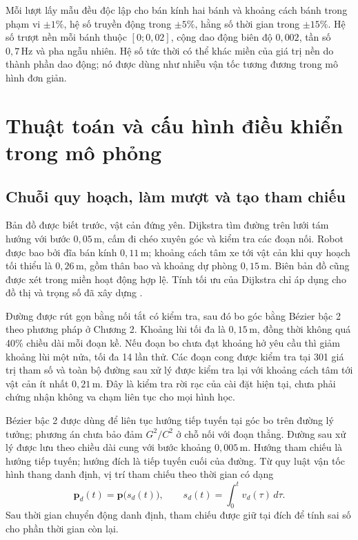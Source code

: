 \documentclass[12pt,a4paper,oneside]{report}
\begin{document}
Mỗi lượt lấy mẫu đều độc lập cho bán kính hai bánh và khoảng cách bánh trong phạm vi \(\pm1\%\), hệ số truyền động trong \(\pm5\%\), hằng số thời gian trong \(\pm15\%\). Hệ số trượt nền mỗi bánh thuộc \([0;0{,}02]\), cộng dao động biên độ \(0{,}002\), tần số \(0{,}7\,\mathrm{Hz}\) và pha ngẫu nhiên. Hệ số tức thời có thể khác miền của giá trị nền do thành phần dao động; nó được dùng như nhiễu vận tốc tương đương trong mô hình đơn giản.

\clearpage
\section{Thuật toán và cấu hình điều khiển trong mô phỏng}

\subsection{Chuỗi quy hoạch, làm mượt và tạo tham chiếu}

Bản đồ được biết trước, vật cản đứng yên. Dijkstra tìm đường trên lưới tám hướng với bước \(0{,}05\,\mathrm{m}\), cấm đi chéo xuyên góc và kiểm tra các đoạn nối. Robot được bao bởi đĩa bán kính \(0{,}11\,\mathrm{m}\); khoảng cách tâm xe tới vật cản khi quy hoạch tối thiểu là \(0{,}26\,\mathrm{m}\), gồm thân bao và khoảng dự phòng \(0{,}15\,\mathrm{m}\). Biên bản đồ cũng được xét trong miền hoạt động hợp lệ. Tính tối ưu của Dijkstra chỉ áp dụng cho đồ thị và trọng số đã xây dựng \cite{lavalle-planning-2006}.

Đường được rút gọn bằng nối tắt có kiểm tra, sau đó bo góc bằng Bézier bậc 2 theo phương pháp ở Chương 2. Khoảng lùi tối đa là \(0{,}15\,\mathrm{m}\), đồng thời không quá 40\% chiều dài mỗi đoạn kề. Nếu đoạn bo chưa đạt khoảng hở yêu cầu thì giảm khoảng lùi một nửa, tối đa 14 lần thử. Các đoạn cong được kiểm tra tại 301 giá trị tham số và toàn bộ đường sau xử lý được kiểm tra lại với khoảng cách tâm tới vật cản ít nhất \(0{,}21\,\mathrm{m}\). Đây là kiểm tra rời rạc của cài đặt hiện tại, chưa phải chứng nhận không va chạm liên tục cho mọi hình học.

Bézier bậc 2 được dùng để liên tục hướng tiếp tuyến tại góc bo trên đường lý tưởng; phương án chưa bảo đảm \(G^2/C^2\) ở chỗ nối với đoạn thẳng. Đường sau xử lý được lưu theo chiều dài cung với bước khoảng \(0{,}005\,\mathrm{m}\). Hướng tham chiếu là hướng tiếp tuyến; hướng đích là tiếp tuyến cuối của đường. Từ quy luật vận tốc hình thang danh định, vị trí tham chiếu theo thời gian có dạng
\begin{equation}
  \mathbf p_d(t)=\mathbf p\bigl(s_d(t)\bigr),\qquad
  s_d(t)=\int_0^t v_d(\tau)\,d\tau.
  \label{eq:c4-time-reference}
\end{equation}
Sau thời gian chuyển động danh định, tham chiếu được giữ tại đích để tính sai số cho phần thời gian còn lại.
\end{document}
